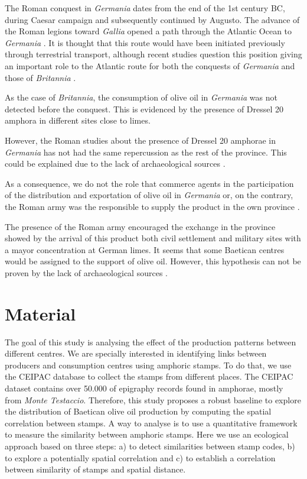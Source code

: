 \documentclass[review]{elsarticle}
\newcommand{\memo}[2]{\textcolor{#1}{#2}}
\newcommand{\xavi}[1]{\memo{magenta}{XRC: #1\\}}
\begin{document}
The Roman conquest in \textit{Germania} dates from the end of the 1st century BC, during Caesar campaign and subsequently continued by Augusto. The advance of the Roman legions toward \textit{Gallia} opened a path through the Atlantic Ocean to \textit{Germania} \citep{remesal_annona_1986,
remesal_baetica_2002}. It is thought that this route would have been initiated previously through terrestrial transport, although recent studies question this position giving an important role to the Atlantic route for both the conquests of \textit{Germania} and those of \textit{Britannia} \citep{remesal_germn_2010,rubio-campillo_ecology_2018}.

As the case of \textit{Britannia}, the consumption of olive oil in \textit{Germania} was not detected before the conquest. This is evidenced by the presence of Dressel 20 amphora in different sites close to limes. 

However, the Roman studies about the presence of Dressel 20 amphorae in \textit{Germania} has not had the same repercussion as the rest of the province. This could be explained due to the lack of archaeological sources \citep{horacio2010llegada}.
  
As a consequence, we do not the role that commerce agents in the participation of the distribution and exportation of olive oil in \textit{Germania} or, on the contrary, the Roman army was the responsible to supply the product in the own province \citep[156]{remesal_germn_2010}. 

The presence of the Roman army encouraged the exchange in the province showed by the arrival of this product both civil settlement and military sites with a mayor concentration at German limes. It seems that some Baetican centres would be assigned to the support of olive oil. However, this hypothesis can not be proven by the lack of archaeological sources \citep[125]{remesal_concierto}. 



\section{Material}


The goal of this study is analysing the effect of the production patterns between different centres. We are specially interested in identifying links between producers and consumption centres using amphoric stamps. To do that, we use the CEIPAC database to collect the stamps from different places. The CEIPAC dataset contains over 50.000 of epigraphy records found in amphorae, mostly from \textit{Monte Testaccio}. Therefore, this study proposes a robust baseline to explore the distribution of Baetican olive oil production by computing the spatial correlation between stamps. A way to analyse is to use a quantitative framework to measure the similarity between amphoric stamps. Here we use an ecological approach based on three steps: a) to detect similarities between stamp codes, b) to explore a potentially spatial correlation and c) to establish a correlation between similarity of stamps and spatial distance. 
\end{document}
